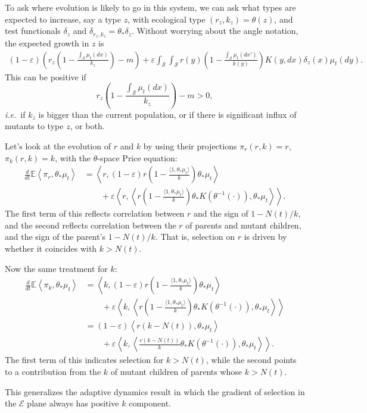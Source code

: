 \documentclass[11pt]{amsart}
\theoremstyle{remark}
\theoremstyle{definition}
\begin{document}
To ask where evolution is likely to go in this system, we can ask what types
are expected to increase, say a type $z$,
with ecological type $(r_z,k_z)=\theta(z)$, and test functionals
$\delta_z$ and $\delta_{r_z,k_z}=\theta_*\delta_z$.
Without worrying about the angle notation, the expected growth in $z$ is
\begin{align*}
	(1-\varepsilon) \left( r_z \left( 1 - \frac{\int_{\mathcal{S}} \mu_t(dx)}{k_z} \right) - m \right) + \varepsilon \int_{\mathcal{S}}\int_{\mathcal{S}}  r(y) \left( 1 - \frac{\int_{\mathcal{S}} \mu_t(dx')}{k(y)} \right) K(y,dx) \delta_z(x) \mu_t(dy).
\end{align*}
This can be positive if 
\[ r_z \left( 1 - \frac{\int_{\mathcal{S}} \mu_t(dx)}{k_z} \right) - m > 0, \]
\emph{i.e.}\ if $k_z$ is bigger than the current population,
or if there is significant influx of mutants to type $z$, or both.

Let's look at the evolution of $r$ and $k$ by using their projections
$\pi_r(r,k)=r$, $\pi_k(r,k)=k$, with the $\theta$-space Price equation:
\begin{align*}
	\frac{d}{dt}\mathbb{E}\left\langle \pi_r, \theta_{*}\mu_t \right\rangle
	&= \left\langle r, (1-\varepsilon) r \left( 1 - \frac{\langle 1, \theta_*{\mu_t}\rangle}{k} \right) \theta_*\mu_t \right\rangle \\
	& \qquad\mbox{} + \varepsilon \left\langle r, \left\langle r \left( 1 - \frac{\langle 1, \theta_*{\mu_t}\rangle}{k} \right) \theta_*K(\theta^{-1}(\cdot)), \theta_{*}\mu_t \right\rangle \right\rangle.
\end{align*}
The first term of this reflects correlation between $r$ and the sign of
$1-N(t)/k$,
and the second reflects correlation between the $r$ of parents and 
mutant children, and the sign of the parent's $1-N(t)/k$.
That is, selection on $r$ is driven by whether it coincides with
$k>N(t)$.

Now the same treatment for $k$:
\begin{align*}
	\frac{d}{dt}\mathbb{E}\left\langle \pi_k, \theta_{*}\mu_t \right\rangle
	&= \left\langle k, (1-\varepsilon) r \left( 1 - \frac{\langle 1, \theta_*{\mu_t}\rangle}{k} \right) \theta_*\mu_t \right\rangle \\
	& \qquad\mbox{} + \varepsilon \left\langle k, \left\langle r \left( 1 - \frac{\langle 1, \theta_*{\mu_t}\rangle}{k} \right) \theta_*K(\theta^{-1}(\cdot)), \theta_{*}\mu_t \right\rangle \right\rangle \\
	&= (1-\varepsilon) \left\langle r (k - N(t)), \theta_*\mu_t \right\rangle \\
	& \qquad\mbox{} + \varepsilon \left\langle k, \left\langle \frac{r \left( k - N(t) \right)}{k} \theta_*K(\theta^{-1}(\cdot)), \theta_{*}\mu_t \right\rangle \right\rangle .
\end{align*}
The first term of this indicates selection for $k>N(t)$,
while the second points to a contribution from the $k$ of mutant children
of parents whose $k>N(t)$.

This generalizes the adaptive dynamics result in which the gradient
of selection in the $\mathcal{E}$ plane always has positive $k$
component.

%


\vfill
\end{document}
